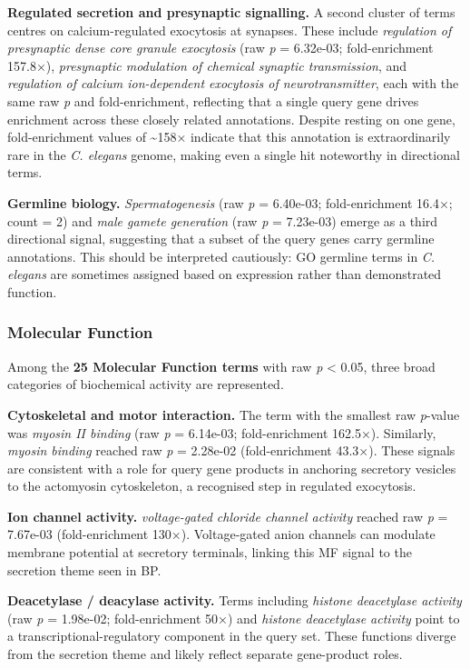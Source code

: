 \documentclass[
  11pt,
]{article}
\begin{document}
\textbf{Regulated secretion and presynaptic signalling.} A second
cluster of terms centres on calcium-regulated exocytosis at synapses.
These include \emph{regulation of presynaptic dense core granule
exocytosis} (raw \emph{p} = 6.32e-03; fold-enrichment 157.8×),
\emph{presynaptic modulation of chemical synaptic transmission}, and
\emph{regulation of calcium ion-dependent exocytosis of
neurotransmitter}, each with the same raw \emph{p} and fold-enrichment,
reflecting that a single query gene drives enrichment across these
closely related annotations. Despite resting on one gene,
fold-enrichment values of \textasciitilde158× indicate that this
annotation is extraordinarily rare in the \emph{C. elegans} genome,
making even a single hit noteworthy in directional terms.

\textbf{Germline biology.} \emph{Spermatogenesis} (raw \emph{p} =
6.40e-03; fold-enrichment 16.4×; count = 2) and \emph{male gamete
generation} (raw \emph{p} = 7.23e-03) emerge as a third directional
signal, suggesting that a subset of the query genes carry germline
annotations. This should be interpreted cautiously: GO germline terms in
\emph{C. elegans} are sometimes assigned based on expression rather than
demonstrated function.

\subsubsection{Molecular Function}\label{molecular-function}

Among the \textbf{25 Molecular Function terms} with raw \emph{p}
\textless{} 0.05, three broad categories of biochemical activity are
represented.

\textbf{Cytoskeletal and motor interaction.} The term with the smallest
raw \emph{p}-value was \emph{myosin II binding} (raw \emph{p} =
6.14e-03; fold-enrichment 162.5×). Similarly, \emph{myosin binding}
reached raw \emph{p} = 2.28e-02 (fold-enrichment 43.3×). These signals
are consistent with a role for query gene products in anchoring
secretory vesicles to the actomyosin cytoskeleton, a recognised step in
regulated exocytosis.

\textbf{Ion channel activity.} \emph{voltage-gated chloride channel
activity} reached raw \emph{p} = 7.67e-03 (fold-enrichment 130×).
Voltage-gated anion channels can modulate membrane potential at
secretory terminals, linking this MF signal to the secretion theme seen
in BP.

\textbf{Deacetylase / deacylase activity.} Terms including \emph{histone
deacetylase activity} (raw \emph{p} = 1.98e-02; fold-enrichment 50×) and
\emph{histone deacetylase activity} point to a
transcriptional-regulatory component in the query set. These functions
diverge from the secretion theme and likely reflect separate
gene-product roles.
\end{document}
